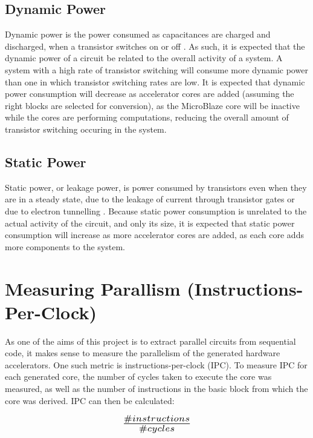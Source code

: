 \documentclass{UoYCSproject}
\begin{document}
\subsection{Dynamic Power}

Dynamic power is the power consumed as capacitances are charged and discharged, when a transistor switches on or off
\cite{power}. As such, it is expected that the dynamic power of a circuit be related to the overall activity of a system.
A system with a high rate of transistor switching will consume more dynamic power than one in which transistor switching rates
are low. It is expected that dynamic power consumption will decrease as accelerator cores are added (assuming the right blocks
are selected for conversion), as the MicroBlaze core will be inactive while the cores are performing computations, reducing
the overall amount of transistor switching occuring in the system.

\subsection{Static Power}

Static power, or leakage power, is power consumed by transistors even when they are in a steady state, due to the leakage
of current through transistor gates or due to electron tunnelling \cite{power}. Because static power consumption is unrelated
to the actual activity of the circuit, and only its size, it is expected that static power consumption will increase as more
accelerator cores are added, as each core adds more components to the system.

\section{Measuring Parallism (Instructions-Per-Clock)}

As one of the aims of this project is to extract parallel circuits from sequential code, it makes sense to measure
the parallelism of the generated hardware accelerators. One such metric is instructions-per-clock (IPC). To measure
IPC for each generated core, the number of cycles taken to execute the core was measured, as well as the number of
instructions in the basic block from which the core was derived. IPC can then be calculated:

\begin{equation}
\scalebox{1.5}{$\frac{\#instructions}{\#cycles}$}
\end{equation}
\end{document}
